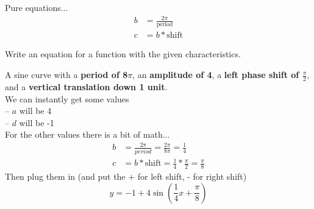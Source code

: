 \documentclass[]{article}
\begin{document}
	Pure equations...
	\begin{align*}
		b &= \frac{2\pi}{\text{period}} \\
		c &= b * \text{shift}
	\end{align*}

Write an equation for a function with the given characteristics.
\par A sine curve with a \textbf{period of 8$\pi$}, an \textbf{amplitude of 4}, a \textbf{left phase shift of $\frac{\pi}{2}$}, and a \textbf{vertical translation down 1 unit}. \\
We can instantly get some values \\
-- $a$ will be 4 \\
-- $d$ will be -1 \\
For the other values there is a bit of math...
\begin{align*}
	b &= \frac{2\pi}{period} = \frac{2\pi}{8\pi} = \frac{1}{4} \\
	c &= b * \text{shift} = \frac{1}{4} * \frac{\pi}{2} = \frac{\pi}{8}
\end{align*}
Then plug them in (and put the + for left shift, - for right shift)
\begin{equation*}
	y = -1 + 4 \sin(\frac{1}{4} x + \frac{\pi}{8})
\end{equation*}
\end{document}
